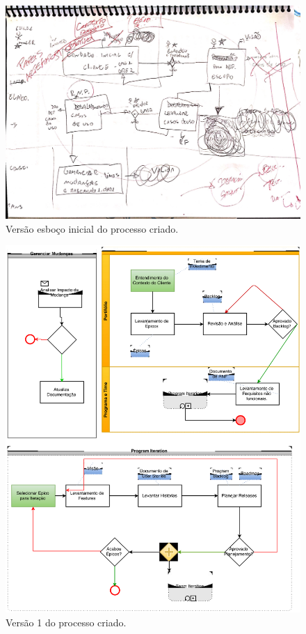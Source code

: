 \begin{apendicesenv}
\begin{figure}[H]
    \centering
	\includegraphics[keepaspectratio=true,scale=0.17]{figuras/evolucao_processo/Processo_v0.eps}
    \caption{Versão esboço inicial do processo criado.}
    \label{fig:processo}
\end{figure}

\begin{figure}[H]
    \centering
	\includegraphics[keepaspectratio=true,scale=0.5]{figuras/evolucao_processo/Processo_v1.eps}
    \caption{Versão 1 do processo criado.}
    \label{fig:processo}
\end{figure}


\end{apendicesenv}
